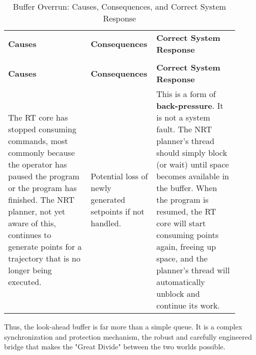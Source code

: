\renewcommand{\arraystretch}{1.2} %
\begin{longtable}{p{0.35\linewidth} p{0.2\linewidth} p{0.35\linewidth}}
    \caption{Buffer Overrun: Causes, Consequences, and Correct System Response}\label{tab:buffer_overrun_analysis}\\
    \toprule %
    \textbf{Causes} & \textbf{Consequences} & \textbf{Correct System Response} \\
    \addlinespace[3pt] %
    \toprule %
    \endfirsthead

    \multicolumn{3}{c}{\tablename~\thetable{} -- continued from previous page} \\
    \toprule %
    \textbf{Causes} & \textbf{Consequences} & \textbf{Correct System Response} \\
    \addlinespace[3pt] %
    \toprule %
    \endhead

    \bottomrule %
    \endfoot

    \bottomrule %
    \endlastfoot

    The RT core has stopped consuming commands, most commonly because the operator has paused the program or the program has finished. The NRT planner, not yet aware of this, continues to generate points for a trajectory that is no longer being executed.
    & %
    Potential loss of newly generated setpoints if not handled.
    & %
    This is a form of \textbf{back-pressure}. It is not a system fault. The NRT planner's thread should simply block (or wait) until space becomes available in the buffer. When the program is resumed, the RT core will start consuming points again, freeing up space, and the planner's thread will automatically unblock and continue its work. \\
\end{longtable}

Thus, the look-ahead buffer is far more than a simple queue. It is a complex synchronization and protection mechanism, the robust and carefully engineered bridge that makes the "Great Divide" between the two worlds possible.



